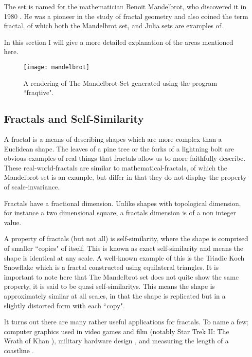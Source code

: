 The set is named for the mathematician Benoit Mandelbrot, who discovered it in 1980 \cite{fracnature , fractimg}. He was a pioneer in the study of 
fractal geometry and also coined the term \gls{fractal}, of which both the Mandelbrot set, and Julia sets are examples of. 

In this section I will give a more detailed explanation of the areas mentioned here. 

\begin{figure}[h]
  \caption{A rendering of The Mandelbrot Set generated using the program ``fraqtive"\cite{fraqtive}.}
  \label{fig:mandelimg}
  \centering
    \texttt{[image: mandelbrot]}
\end{figure}

\subsection*{Fractals and Self-Similarity} 
A \gls{fractal} is a means of describing shapes which are more complex than a Euclidean shape. The leaves of a pine tree or the forks of a 
lightning bolt are obvious examples of real things that fractals allow us to more faithfully describe. 
These \glspl{real-world-fractal} are similar to \glspl{mathematical-fractal}, 
of which the Mandelbrot set is an example, but differ in that they do not display the property of \gls{scale-invariance}. 

Fractals have a fractional dimension. Unlike shapes with topological dimension, for instance a two dimensional square, 
a \glspl{fractal} dimension is of a non integer value.

A property of fractals (but not all) is \gls{self-similarity}, where the shape is comprised of smaller ``copies" of itself. 
This is known as \gls{exact self-similarity} and means the shape is identical at any scale.
A well-known example of this is the Triadic Koch Snowflake which is a fractal constructed using equilateral triangles. 
It is important to note here that The Mandelbrot set does not quite show the same property, it is said to be 
\glspl{quasi self-similarity}. This means the shape is approximately similar at all scales, in that the shape is replicated but in a slightly distorted
form with each ``copy".

It turns out there are many rather useful applications for fractals. To name a few; 
computer graphics used in video games and film (notably Star Trek II: The Wrath of Khan \cite[p.~8]{fractimg}), 
military hardware design \cite{fractantenna}, and measuring the length of a coastline \cite{coastline}.

